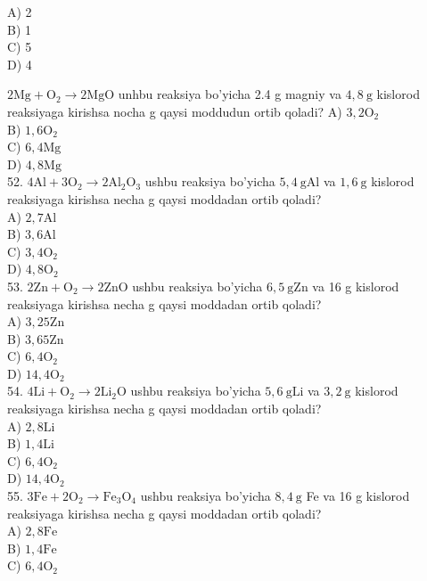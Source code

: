 A) 2\\
B) 1\\
C) 5\\
D) 4
  \item $2 \mathrm{Mg}+\mathrm{O}_{2} \rightarrow 2 \mathrm{MgO}$ unhbu reaksiya bo'yicha 2.4 g magniy va $4,8 \mathrm{~g}$ kislorod reaksiyaga kirishsa nocha g qaysi moddudun ortib qoladi?
A) $3,2 \mathrm{O}_{2}$\\
B) $1,6 \mathrm{O}_{2}$\\
C) $6,4 \mathrm{Mg}$\\
D) $4,8 \mathrm{Mg}$\\
52. $4 \mathrm{Al}+3 \mathrm{O}_{2} \rightarrow 2 \mathrm{Al}_{2} \mathrm{O}_{3}$ ushbu reaksiya bo'yicha $5,4 \mathrm{~g} \mathrm{Al}$ va $1,6 \mathrm{~g}$ kislorod reaksiyaga kirishsa necha g qaysi moddadan ortib qoladi?\\
A) $2,7 \mathrm{Al}$\\
B) $3,6 \mathrm{Al}$\\
C) $3,4 \mathrm{O}_{2}$\\
D) $4,8 \mathrm{O}_{2}$\\
53. $2 \mathrm{Zn}+\mathrm{O}_{2} \rightarrow 2 \mathrm{ZnO}$ ushbu reaksiya bo'yicha $6,5 \mathrm{~g} \mathrm{Zn}$ va 16 g kislorod reaksiyaga kirishsa necha g qaysi moddadan ortib qoladi?\\
A) $3,25 \mathrm{Zn}$\\
B) $3,65 \mathrm{Zn}$\\
C) $6,4 \mathrm{O}_{2}$\\
D) $14,4 \mathrm{O}_{2}$\\
54. $4 \mathrm{Li}+\mathrm{O}_{2} \rightarrow 2 \mathrm{Li}_{2} \mathrm{O}$ ushbu reaksiya bo'yicha $5,6 \mathrm{~g} \mathrm{Li}$ va $3,2 \mathrm{~g}$ kislorod reaksiyaga kirishsa necha g qaysi moddadan ortib qoladi?\\
A) $2,8 \mathrm{Li}$\\
B) $1,4 \mathrm{Li}$\\
C) $6,4 \mathrm{O}_{2}$\\
D) $14,4 \mathrm{O}_{2}$\\
55. $3 \mathrm{Fe}+2 \mathrm{O}_{2} \rightarrow \mathrm{Fe}_{3} \mathrm{O}_{4}$ ushbu reaksiya bo'yicha $8,4 \mathrm{~g}$ Fe va 16 g kislorod reaksiyaga kirishsa necha g qaysi moddadan ortib qoladi?\\
A) $2,8 \mathrm{Fe}$\\
B) $1,4 \mathrm{Fe}$\\
C) $6,4 \mathrm{O}_{2}$\\
